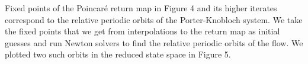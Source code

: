 \color{black}
\indent
Fixed points of the Poincar\'e return map in Figure 4 and its higher iterates 
correspond to the relative periodic orbits of the Porter-Knobloch system. We 
take the fixed points that we get from interpolations to the return map as 
initial guesses and run Newton solvers to find the relative periodic orbits 
of the flow. We plotted two such orbits in the reduced state space in Figure 5.
